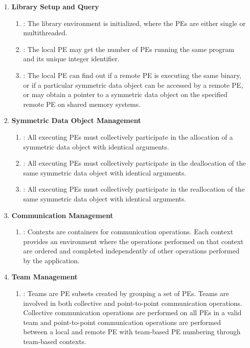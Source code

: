 \begin{enumerate}

\item \textbf{Library Setup and Query}
\begin{enumerate}
  \item {}: The \openshmem library environment is initialized,
   where the \acp{PE} are either single or multithreaded.
  \item {}: The local \ac{PE} may get the number of \acp{PE} running
      the same program and its unique integer identifier.
  \item {}: The local \ac{PE} can find out if a remote \ac{PE} is
      executing the same binary, or if a particular symmetric data object can be
      accessed by a remote \ac{PE}, or may obtain a pointer to a symmetric data
      object on the specified remote \ac{PE} on shared memory systems.
\end{enumerate}

\item \textbf{Symmetric Data Object Management}
\begin{enumerate}
  \item {}: All executing \acp{PE} must collectively participate in the
      allocation of a symmetric data object with identical arguments.
  \item  {}: All executing \acp{PE} must collectively participate in the
      deallocation of the same symmetric data object with identical arguments.
  \item  {}: All executing \acp{PE} must collectively participate in the
      reallocation of the same symmetric data object with identical arguments.
\end{enumerate}

\item \textbf{Communication Management}
\begin{enumerate}
    \item {}: Contexts are containers for communication operations.
        Each context provides an environment where the operations performed on
        that context are ordered and completed independently of other operations
        performed by the application.
\end{enumerate}

\item \textbf{Team Management}
\begin{enumerate}
    \item {}: Teams are \ac{PE} subsets created by grouping a set of
    \acp{PE}. Teams are involved in both collective and point-to-point
    communication operations. Collective communication operations are performed
    on all \acp{PE} in a valid team and point-to-point communication operations
    are performed between a local and remote \ac{PE} with team-based \ac{PE}
    numbering through team-based contexts.
\end{enumerate}


\end{enumerate}
